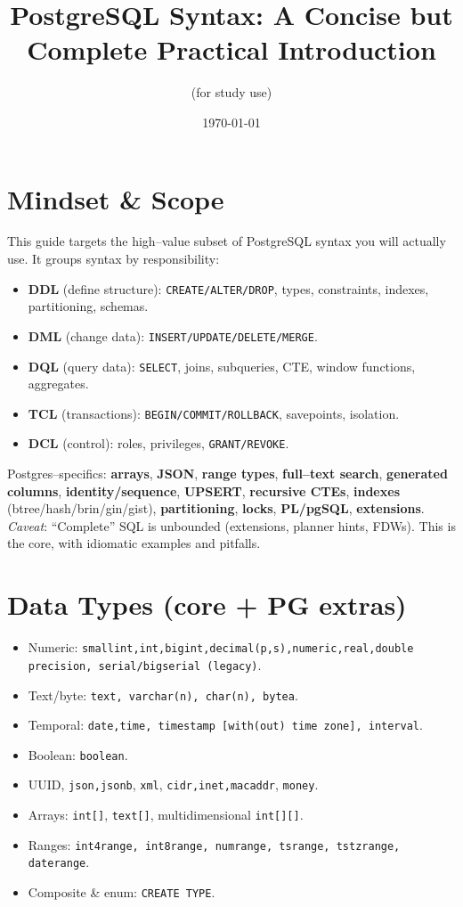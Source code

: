 \documentclass[10pt]{article}
\title{PostgreSQL Syntax: A Concise but Complete Practical Introduction}
\author{(for study use)}
\date{\today}
\begin{document}
\maketitle
\tableofcontents

\section{Mindset \& Scope}
This guide targets the high–value subset of PostgreSQL syntax you will actually use. It groups syntax by responsibility:
\begin{itemize}
  \item \textbf{DDL} (define structure): \texttt{CREATE/ALTER/DROP}, types, constraints, indexes, partitioning, schemas.
  \item \textbf{DML} (change data): \texttt{INSERT/UPDATE/DELETE/MERGE}.
  \item \textbf{DQL} (query data): \texttt{SELECT}, joins, subqueries, CTE, window functions, aggregates.
  \item \textbf{TCL} (transactions): \texttt{BEGIN/COMMIT/ROLLBACK}, savepoints, isolation.
  \item \textbf{DCL} (control): roles, privileges, \texttt{GRANT/REVOKE}.
\end{itemize}
Postgres–specifics: \textbf{arrays}, \textbf{JSON}, \textbf{range types}, \textbf{full–text search}, \textbf{generated columns}, \textbf{identity/sequence}, \textbf{UPSERT}, \textbf{recursive CTEs}, \textbf{indexes} (btree/hash/brin/gin/gist), \textbf{partitioning}, \textbf{locks}, \textbf{PL/pgSQL}, \textbf{extensions}.\\
\textit{Caveat}: “Complete” SQL is unbounded (extensions, planner hints, FDWs). This is the core, with idiomatic examples and pitfalls.

\section{Data Types (core + PG extras)}
\begin{itemize}
  \item Numeric: \texttt{smallint,int,bigint,decimal(p,s),numeric,real,double precision, serial/bigserial (legacy)}.
  \item Text/byte: \texttt{text, varchar(n), char(n), bytea}.
  \item Temporal: \texttt{date,time, timestamp [with(out) time zone], interval}.
  \item Boolean: \texttt{boolean}.
  \item UUID, \texttt{json,jsonb}, \texttt{xml}, \texttt{cidr,inet,macaddr}, \texttt{money}.
  \item Arrays: \texttt{int[]}, \texttt{text[]}, multidimensional \texttt{int[][]}.
  \item Ranges: \texttt{int4range, int8range, numrange, tsrange, tstzrange, daterange}.
  \item Composite \& enum: \texttt{CREATE TYPE}.
\end{itemize}
\end{document}

